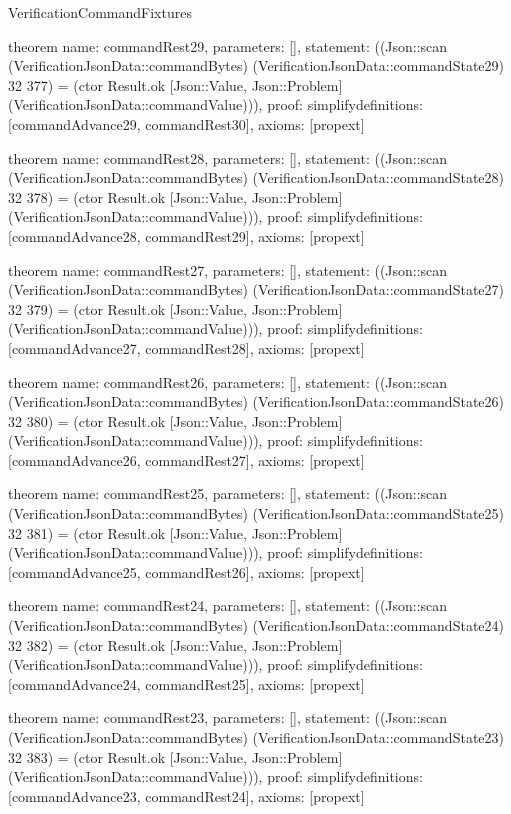 \begin{lexlean}{VerificationCommandFixtures}
\begin{semanticmodule}
theorem{
  name: commandRest29,
  parameters: [],
  statement: ((Json::scan (VerificationJsonData::commandBytes) (VerificationJsonData::commandState29) 32 377) = (ctor Result.ok [Json::Value, Json::Problem] (VerificationJsonData::commandValue))),
  proof: simplify{definitions: [commandAdvance29, commandRest30]},
  axioms: [propext]
}

theorem{
  name: commandRest28,
  parameters: [],
  statement: ((Json::scan (VerificationJsonData::commandBytes) (VerificationJsonData::commandState28) 32 378) = (ctor Result.ok [Json::Value, Json::Problem] (VerificationJsonData::commandValue))),
  proof: simplify{definitions: [commandAdvance28, commandRest29]},
  axioms: [propext]
}

theorem{
  name: commandRest27,
  parameters: [],
  statement: ((Json::scan (VerificationJsonData::commandBytes) (VerificationJsonData::commandState27) 32 379) = (ctor Result.ok [Json::Value, Json::Problem] (VerificationJsonData::commandValue))),
  proof: simplify{definitions: [commandAdvance27, commandRest28]},
  axioms: [propext]
}

theorem{
  name: commandRest26,
  parameters: [],
  statement: ((Json::scan (VerificationJsonData::commandBytes) (VerificationJsonData::commandState26) 32 380) = (ctor Result.ok [Json::Value, Json::Problem] (VerificationJsonData::commandValue))),
  proof: simplify{definitions: [commandAdvance26, commandRest27]},
  axioms: [propext]
}

theorem{
  name: commandRest25,
  parameters: [],
  statement: ((Json::scan (VerificationJsonData::commandBytes) (VerificationJsonData::commandState25) 32 381) = (ctor Result.ok [Json::Value, Json::Problem] (VerificationJsonData::commandValue))),
  proof: simplify{definitions: [commandAdvance25, commandRest26]},
  axioms: [propext]
}

theorem{
  name: commandRest24,
  parameters: [],
  statement: ((Json::scan (VerificationJsonData::commandBytes) (VerificationJsonData::commandState24) 32 382) = (ctor Result.ok [Json::Value, Json::Problem] (VerificationJsonData::commandValue))),
  proof: simplify{definitions: [commandAdvance24, commandRest25]},
  axioms: [propext]
}

theorem{
  name: commandRest23,
  parameters: [],
  statement: ((Json::scan (VerificationJsonData::commandBytes) (VerificationJsonData::commandState23) 32 383) = (ctor Result.ok [Json::Value, Json::Problem] (VerificationJsonData::commandValue))),
  proof: simplify{definitions: [commandAdvance23, commandRest24]},
  axioms: [propext]
}


\end{semanticmodule}
\end{lexlean}
